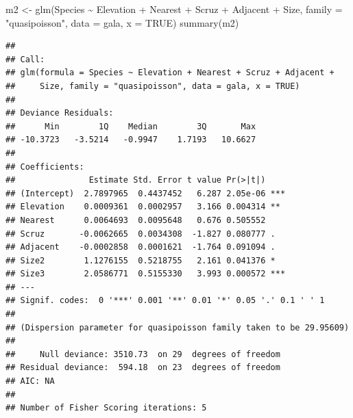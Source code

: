 \documentclass[
  ignorenonframetext,
]{beamer}
\newenvironment{Shaded}{\begin{snugshade}}{\end{snugshade}}
\newcommand{\AttributeTok}[1]{\textcolor[rgb]{0.77,0.63,0.00}{#1}}
\newcommand{\ConstantTok}[1]{\textcolor[rgb]{0.00,0.00,0.00}{#1}}
\newcommand{\FunctionTok}[1]{\textcolor[rgb]{0.00,0.00,0.00}{#1}}
\newcommand{\NormalTok}[1]{#1}
\newcommand{\OtherTok}[1]{\textcolor[rgb]{0.56,0.35,0.01}{#1}}
\newcommand{\SpecialCharTok}[1]{\textcolor[rgb]{0.00,0.00,0.00}{#1}}
\newcommand{\StringTok}[1]{\textcolor[rgb]{0.31,0.60,0.02}{#1}}
\begin{document}
\begin{frame}[fragile]{}
\protect\hypertarget{section-4}{}
\tiny

\begin{Shaded}
\begin{Highlighting}[]
\NormalTok{m2 }\OtherTok{\textless{}{-}} \FunctionTok{glm}\NormalTok{(Species }\SpecialCharTok{\textasciitilde{}}\NormalTok{ Elevation }\SpecialCharTok{+}\NormalTok{ Nearest }\SpecialCharTok{+}\NormalTok{ Scruz }\SpecialCharTok{+}\NormalTok{ Adjacent }\SpecialCharTok{+}\NormalTok{ Size, }
          \AttributeTok{family =} \StringTok{"quasipoisson"}\NormalTok{, }\AttributeTok{data =}\NormalTok{ gala, }\AttributeTok{x =} \ConstantTok{TRUE}\NormalTok{)}
\FunctionTok{summary}\NormalTok{(m2)}
\end{Highlighting}
\end{Shaded}

\begin{verbatim}
## 
## Call:
## glm(formula = Species ~ Elevation + Nearest + Scruz + Adjacent + 
##     Size, family = "quasipoisson", data = gala, x = TRUE)
## 
## Deviance Residuals: 
##      Min        1Q    Median        3Q       Max  
## -10.3723   -3.5214   -0.9947    1.7193   10.6627  
## 
## Coefficients:
##               Estimate Std. Error t value Pr(>|t|)    
## (Intercept)  2.7897965  0.4437452   6.287 2.05e-06 ***
## Elevation    0.0009361  0.0002957   3.166 0.004314 ** 
## Nearest      0.0064693  0.0095648   0.676 0.505552    
## Scruz       -0.0062665  0.0034308  -1.827 0.080777 .  
## Adjacent    -0.0002858  0.0001621  -1.764 0.091094 .  
## Size2        1.1276155  0.5218755   2.161 0.041376 *  
## Size3        2.0586771  0.5155330   3.993 0.000572 ***
## ---
## Signif. codes:  0 '***' 0.001 '**' 0.01 '*' 0.05 '.' 0.1 ' ' 1
## 
## (Dispersion parameter for quasipoisson family taken to be 29.95609)
## 
##     Null deviance: 3510.73  on 29  degrees of freedom
## Residual deviance:  594.18  on 23  degrees of freedom
## AIC: NA
## 
## Number of Fisher Scoring iterations: 5
\end{verbatim}
\end{frame}
\end{document}
